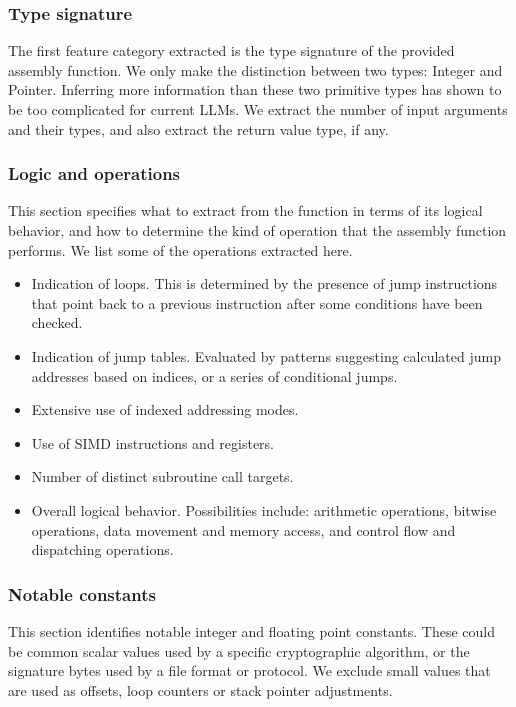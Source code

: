 \subsubsection{Type signature}

The first feature category extracted is the type signature of the provided assembly function.
We only make the distinction between two types: Integer and Pointer. Inferring more information than these two 
primitive types has shown to be too complicated for current LLMs. We extract the number of input arguments
and their types, and also extract the return value type, if any.

\subsubsection{Logic and operations}

This section specifies what to extract from the function in terms of its logical behavior, and how to determine the kind of
operation that the assembly function performs. We list some of the operations extracted here.


\begin{itemize}
\item Indication of loops. This is determined by the presence of jump instructions that point back to a previous
instruction after some conditions have been checked.
\item Indication of jump tables. Evaluated by patterns suggesting calculated jump addresses based on
indices, or a series of conditional jumps.
\item Extensive use of indexed addressing modes.
\item Use of SIMD instructions and registers.
\item Number of distinct subroutine call targets.
\item Overall logical behavior. Possibilities include: arithmetic operations, bitwise operations, data movement and memory access,
and control flow and dispatching operations.
\end{itemize}

\subsubsection{Notable constants}

This section identifies notable integer and floating point constants.  These could be common scalar values used by
a specific cryptographic algorithm, or the signature bytes used by a file format or protocol. We exclude small
values that are used as offsets, loop counters or stack pointer adjustments.

